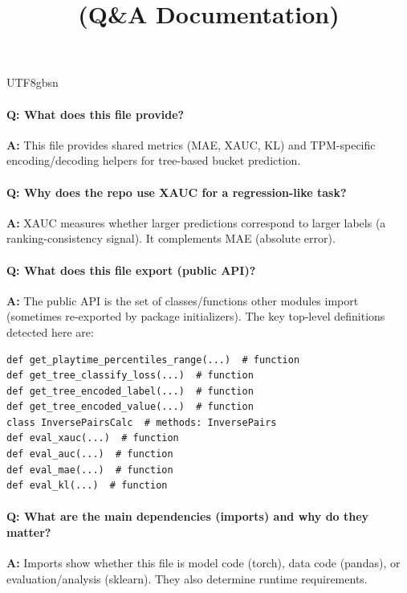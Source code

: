 \documentclass[11pt]{article}
\title{\texttt{\detokenize{utils.py}} (Q\&A Documentation)}
\author{}
\date{}
\begin{document}
\begin{CJK*}{UTF8}{gbsn}
\maketitle

\paragraph{Q: What does this file provide?}
\textbf{A:} This file provides shared metrics (MAE, XAUC, KL) and TPM-specific encoding/decoding helpers for tree-based bucket prediction.

\paragraph{Q: Why does the repo use XAUC for a regression-like task?}
\textbf{A:} XAUC measures whether larger predictions correspond to larger labels (a ranking-consistency signal). It complements MAE (absolute error).

\paragraph{Q: What does this file export (public API)?}
\textbf{A:} The public API is the set of classes/functions other modules import (sometimes re-exported by package initializers). The key top-level definitions detected here are:

\begin{Verbatim}[fontsize=\small]
def get_playtime_percentiles_range(...)  # function
def get_tree_classify_loss(...)  # function
def get_tree_encoded_label(...)  # function
def get_tree_encoded_value(...)  # function
class InversePairsCalc  # methods: InversePairs
def eval_xauc(...)  # function
def eval_auc(...)  # function
def eval_mae(...)  # function
def eval_kl(...)  # function
\end{Verbatim}

\paragraph{Q: What are the main dependencies (imports) and why do they matter?}
\textbf{A:} Imports show whether this file is model code (torch), data code (pandas), or evaluation/analysis (sklearn). They also determine runtime requirements.

\vspace{1mm}



\end{CJK*}
\end{document}
